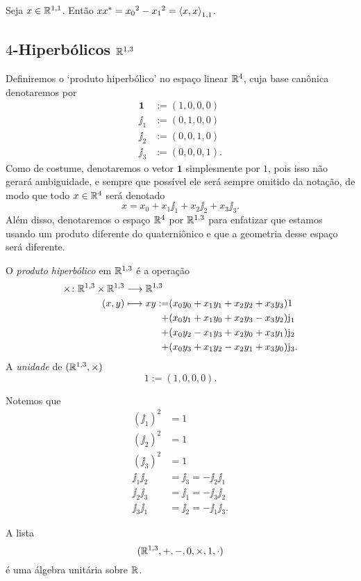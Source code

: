 \begin{exercise}
Seja $x \in \mathbb{R}^{1,1}$. Então $x{x}^{\ast} = {x_0}^2 - {x_1}^2 = \left\langle{x},{x}\right\rangle_{1,1}$.
\end{exercise}




\subsection{$4$-Hiperbólicos \texorpdfstring{$\mathbb{R}^{1,3}$}{}}

Definiremos o `produto hiperbólico' no espaço linear $\mathbb{R}^4$, cuja base canônica denotaremos por
	\begin{align*}
	\bm 1 &:= (1,0,0,0) \\
	\jj_1 &:= (0,1,0,0) \\
	\jj_2 &:= (0,0,1,0) \\
	\jj_3 &:= (0,0,0,1).
	\end{align*}
Como de costume, denotaremos o vetor $\bm 1$ simplesmente por $1$, pois isso não gerará ambiguidade, e sempre que possível ele será sempre omitido da notação, de modo que todo $x \in \mathbb{R}^4$ será denotado
	\begin{equation*}
	x = x_0 + x_1 \jj_1 + x_2 \jj_2 + x_3 \jj_3.
	\end{equation*}
Além disso, denotaremos o espaço $\mathbb{R}^4$ por $\mathbb{R}^{1,3}$ para enfatizar que estamos usando um produto diferente do quaterniônico e que a geometria desse espaço será diferente.

\begin{definition}
O \emph{produto hiperbólico} em $\mathbb{R}^{1,3}$ é a operação
	\begin{align*}
	\func{\htimes}{\R^{1,3} \times \R^{1,3}}{\R^{1,3}}{(x,y)}{
		\begin{aligned}[t]
		xy := &(x_0y_0 + x_1y_1 + x_2y_2 + x_3y_3) 1 \\
			+ &(x_0y_1 + x_1y_0 + x_2y_3 - x_3y_2) \jj_1 \\
			+ &(x_0y_2 - x_1y_3 + x_2y_0 + x_3y_1) \jj_2 \\
			+ &(x_0y_3 + x_1y_2 - x_2y_1 + x_3y_0) \jj_3 .
		\end{aligned}
	}
	\end{align*}
A \emph{unidade} de $(\mathbb{R}^{1,3},\times)$
	\begin{equation*}
	1 := (1,0,0,0).
	\end{equation*}
\end{definition}

Notemos que
	\begin{align*}
	(\jj_1)^2 &= 1 \\
	(\jj_2)^2 &= 1 \\
	(\jj_3)^2 &= 1 \\
	\jj_1\jj_2 &= \jj_3 = -\jj_2\jj_1 \\
	\jj_2\jj_3 &= \jj_1 = -\jj_3\jj_2 \\
	\jj_3\jj_1 &= \jj_2 = -\jj_1\jj_3.
	\end{align*}

\begin{exercise}
A lista
	\begin{equation*}
	(\mathbb{R}^{1,3},+,-,0,\times,1,\cdot)
	\end{equation*}
é uma álgebra unitária sobre $\mathbb{R}$.
\end{exercise}
